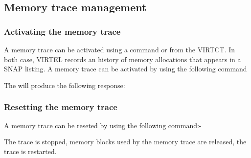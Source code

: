 \documentclass[letterpaper,10pt,english]{sphinxmanual}
\begin{document}
\subsection{Memory trace management}
\label{\detokenize{audit_operations_ and_performance:memory-trace-management}}\label{\detokenize{audit_operations_ and_performance:index-41}}

\subsubsection{Activating the memory trace}
\label{\detokenize{audit_operations_ and_performance:activating-the-memory-trace}}
A memory trace can be activated using a command or from the VIRTCT. In both case, VIRTEL records an history of memory allocations that appears in a SNAP listing. A memory trace can be activated by using the following command

\begin{sphinxVerbatim}[commandchars=\\\{\}]
\end{sphinxVerbatim}

The will produce the following response:

\begin{sphinxVerbatim}[commandchars=\\\{\}]
 
   
          
\end{sphinxVerbatim}


\subsubsection{Resetting the memory trace}
\label{\detokenize{audit_operations_ and_performance:resetting-the-memory-trace}}
A memory trace can be reseted by using the following command:-

\begin{sphinxVerbatim}[commandchars=\\\{\}]
\end{sphinxVerbatim}

The trace is stopped, memory blocks used by the memory trace are released, the trace is restarted.
\end{document}
